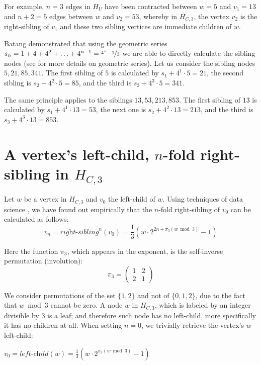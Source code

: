 For example, $n=3$ edges in $H_U$ have been contracted between $w=5$ and $v_1=13$ and $n+2=5$ edges between $w$ and $v_2=53$, whereby in $H_{C,3}$, the vertex $v_2$ is the right-sibling of $v_1$ and these two sibling vertices are immediate children of $w$.

Batang \cite{Ref_Batang} demonstrated that using the geometric series $s_n=1+4+4^2+\ldots+4^{n-1}=\nicefrac{4^n-1}{3}$ we are able to directly calculate the sibling nodes (see \cite[p.~191-192]{Ref_Teschl_2013} for more details on geometric series). Let us consider the sibling nodes $5,21,85,341$. The first sibling of $5$ is calculated by $s_1+4^1\cdot5=21$, the second sibling is $s_2+4^2\cdot5=85$, and the third is $s_3+4^3\cdot5=341$.

The same principle applies to the siblings $13,53,213,853$. The first sibling of $13$ is calculated by $s_1+4^1\cdot13=53$, the next one is $s_2+4^2\cdot13=213$, and the third is $s_3+4^3\cdot13=853$.

\section{\texorpdfstring{A vertex's left-child, $n$-fold right-sibling in $H_{C,3}$}{A vertex's left-child, n-fold right-sibling in HC3}}
\label{sec:left_child_right_sibling_3}

Let $w$ be a vertex in $H_{C,3}$ and $v_0$ the left-child of $w$. Using techniques of data science \cite{Ref_Koch_Github}, we have found out empirically that the $n$-fold right-sibling of $v_0$ can be calculated as follows:
\begin{equation}
\label{eq:nfold_right_sibling_3}
	v_n=\textit{right-sibling}^n(v_0)=\frac{1}{3}\left(w\cdot2^{2n+\pi_3(w\bmod 3)}-1\right)
\end{equation}

Here the function $\pi_3$, which appears in the exponent, is the self-inverse permutation (involution):
\begin{equation}
\label{eq:pi_3}
	\pi_3=\left(\begin{array}{cc}
	1 & 2\\
	2 & 1
	\end{array}\right)
\end{equation}

We consider permutations of the set $\{1,2\}$ and not of $\{0,1,2\}$, due to the fact that $w\bmod 3$ cannot be zero. A node $w$ in $H_{C,3}$, which is labeled by an integer divisible by $3$ is a leaf; and therefore such node has no left-child, more specifically it has no children at all. When setting $n=0$, we trivially retrieve the vertex's $w$ left-child:
\begin{center}
	$v_0=\textit{left-child}(w)=\frac{1}{3}\left(w\cdot2^{\pi_3(w\bmod 3)}-1\right)$
\end{center}

